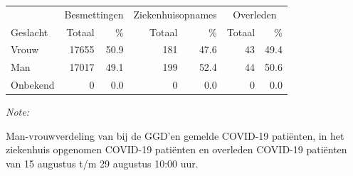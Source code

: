 \documentclass[
  english,
  man,floatsintext]{apa6}
\begin{document}
\begin{table}
\centering\begingroup\fontsize{11}{13}\selectfont

\begin{threeparttable}
\begin{tabular}{lrrrrrr}
\toprule
\multicolumn{1}{c}{ } & \multicolumn{2}{c}{Besmettingen} & \multicolumn{2}{c}{Ziekenhuisopnames} & \multicolumn{2}{c}{Overleden} \\
\cmidrule(l{3pt}r{3pt}){2-3} \cmidrule(l{3pt}r{3pt}){4-5} \cmidrule(l{3pt}r{3pt}){6-7}
Geslacht & Totaal & \% & Totaal & \% & Totaal & \%\\
\midrule
Vrouw & 17655 & 50.9 & 181 & 47.6 & 43 & 49.4\\
Man & 17017 & 49.1 & 199 & 52.4 & 44 & 50.6\\
Onbekend & 0 & 0.0 & 0 & 0.0 & 0 & 0.0\\
\bottomrule
\end{tabular}
\begin{tablenotes}
\item \textit{Note: } 
\item Man-vrouwverdeling van bij de GGD’en gemelde COVID-19 patiënten, in het ziekenhuis opgenomen COVID-19 patiënten en overleden COVID-19 patiënten van 15 augustus t/m 29 augustus 10:00 uur.
\end{tablenotes}
\end{threeparttable}
\endgroup{}
\end{table}
\newpage
\end{document}

